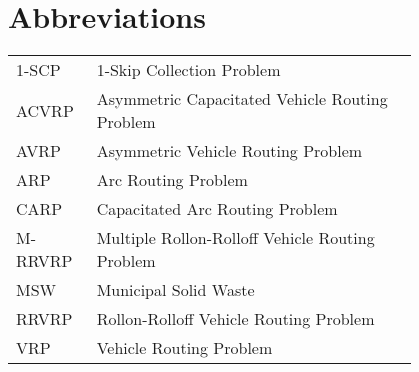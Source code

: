 \chapter*{Abbreviations}

\begin{flushleft}
\begin{tabular}{l p{0.8\linewidth}}
1-SCP	& 1-Skip Collection Problem \\
ACVRP	& Asymmetric Capacitated Vehicle Routing Problem \\
AVRP	& Asymmetric Vehicle Routing Problem \\
ARP	& Arc Routing Problem \\
CARP	& Capacitated Arc Routing Problem \\
M-RRVRP	& Multiple Rollon-Rolloff Vehicle Routing Problem \\
MSW	& Municipal Solid Waste \\
RRVRP	& Rollon-Rolloff Vehicle Routing Problem \\
VRP	& Vehicle Routing Problem \\
\end{tabular}
\end{flushleft}

